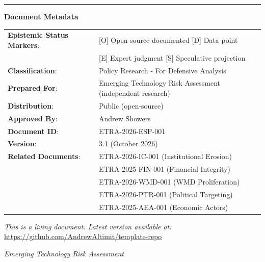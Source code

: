 \documentclass[11pt,letterpaper]{article}
\begin{document}
\begin{center}
\rule{0.6\textwidth}{0.5pt}
\end{center}

\vspace{0.5cm}

\begin{center}
\small\textbf{Document Metadata}

\vspace{0.5em}

\begin{tabular}{ll}
\textbf{Epistemic Status Markers}: & [O] Open-source documented \textbar{} [D] Data point \\
& [E] Expert judgment \textbar{} [S] Speculative projection \\
\textbf{Classification}: & Policy Research - For Defensive Analysis \\
\textbf{Prepared For}: & Emerging Technology Risk Assessment (independent research) \\
\textbf{Distribution}: & Public (open-source) \\
\textbf{Approved By}: & Andrew Showers \\
\textbf{Document ID}: & ETRA-2026-ESP-001 \\
\textbf{Version}: & 3.1 (October 2026) \\
\textbf{Related Documents}: & ETRA-2026-IC-001 (Institutional Erosion) \\
& ETRA-2025-FIN-001 (Financial Integrity) \\
& ETRA-2026-WMD-001 (WMD Proliferation) \\
& ETRA-2026-PTR-001 (Political Targeting) \\
& ETRA-2025-AEA-001 (Economic Actors) \\
\end{tabular}
\end{center}

\vspace{0.5cm}

\begin{center}
\small
\textit{This is a living document. Latest version available at:}\\[0.3em]
\url{https://github.com/AndrewAltimit/template-repo}
\end{center}

\vspace{0.5cm}

\begin{center}
\textit{Emerging Technology Risk Assessment}
\end{center}
\end{document}
